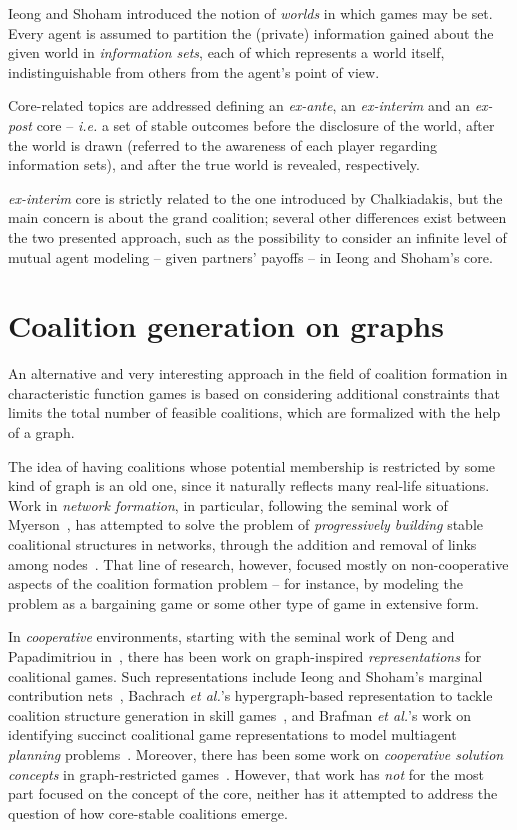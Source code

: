 \documentclass[11pt, twoside, titlepage, a4paper, openright]{report}
\begin{document}
Ieong and Shoham \cite{DBLP:conf/aaai/IeongS08} introduced the notion of \textit{worlds} in which games may be set. Every agent is assumed to partition the (private) information gained about the given world in \textit{information sets}, each of which represents a world itself, indistinguishable from others from the agent's point of view.

\noindent Core-related topics are addressed defining an \textit{ex-ante}, an \textit{ex-interim} and an \textit{ex-post} core -- \textit{i.e.} a set of stable outcomes before the disclosure of the world, after the world is drawn (referred to the awareness of each player regarding information sets), and after the true world is revealed, respectively.

\textit{ex-interim} core is strictly related to the one introduced by Chalkiadakis, but the main concern is about the grand coalition; several other differences exist between the two presented approach, such as the possibility to consider an infinite level of mutual agent modeling -- given partners' payoffs -- in Ieong and Shoham's core.

\section{Coalition generation on graphs}

An alternative and very interesting approach in the field of coalition formation in characteristic function games is based on considering additional constraints that limits the total number of feasible coalitions, which are formalized with the help of a graph.

The idea of having coalitions whose potential membership is restricted by some kind of graph is an old one, since it naturally reflects many real-life situations. Work in {\em network formation}, in particular, following the seminal work of Myerson~\cite{citeulike:5706315}, has attempted to solve the problem of {\em progressively building} stable coalitional structures in networks, through the addition and removal of links among nodes~\cite{jackson2003}. That line of research, however, focused mostly on non-cooperative aspects of the coalition formation problem -- for instance, by modeling the problem as a bargaining game or some other type of game in extensive form.

In {\em cooperative} environments, starting with the seminal work of Deng and Papadimitriou in~\cite{deng94}, there has been work on graph-inspired {\em representations} for coalitional games. Such representations include Ieong and Shoham's marginal contribution nets~\cite{ieongmcnets}, Bachrach {\em et al.}'s hypergraph-based representation to tackle coalition structure generation in skill games~\cite{DBLP:conf/aaai/BachrachMJK10}, and Brafman {\em et al.}'s work on identifying succinct coalitional game representations to model multiagent {\em planning} problems~\cite{DBLP:conf/aaai/BrafmanDET10}. Moreover, there has been some work on {\em cooperative solution concepts} in graph-restricted games~\cite{RePEc:dgr:uvatin:20060056}. However, that work has {\em not} for the most part focused on the concept of the core, neither has it attempted to address the question of how core-stable coalitions emerge.
\end{document}
